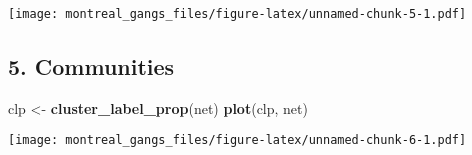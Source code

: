 \documentclass[
]{article}
\newenvironment{Shaded}{\begin{snugshade}}{\end{snugshade}}
\newcommand{\FunctionTok}[1]{\textcolor[rgb]{0.13,0.29,0.53}{\textbf{#1}}}
\newcommand{\NormalTok}[1]{#1}
\newcommand{\OtherTok}[1]{\textcolor[rgb]{0.56,0.35,0.01}{#1}}
\begin{document}
\texttt{[image: montreal\_gangs\_files/figure-latex/unnamed-chunk-5-1.pdf]}

\hypertarget{communities}{%
\subsection{5. Communities}\label{communities}}

\begin{Shaded}
\begin{Highlighting}[]
\NormalTok{clp }\OtherTok{\textless{}{-}} \FunctionTok{cluster\_label\_prop}\NormalTok{(net)}
\FunctionTok{plot}\NormalTok{(clp, net)}
\end{Highlighting}
\end{Shaded}

\texttt{[image: montreal\_gangs\_files/figure-latex/unnamed-chunk-6-1.pdf]}
\end{document}
